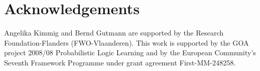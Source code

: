 \documentclass{tlp}
\begin{document}
\section*{Acknowledgements} 

Angelika Kimmig and Bernd Gutmann are supported by the Research
Foundation-Flanders (FWO-Vlaanderen). This work is supported by the
GOA project 2008/08 Probabilistic Logic Learning and by the European
Community's Seventh Framework Programme under grant agreement
First-MM-248258.



\newpage 



\end{document}
